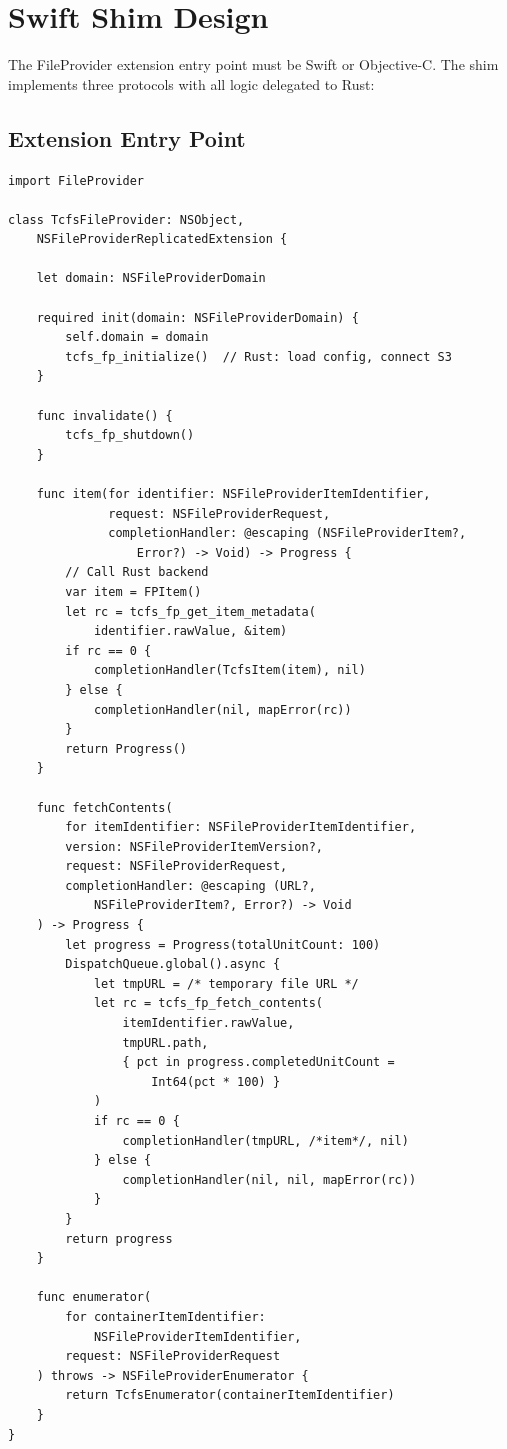 \documentclass[11pt,a4paper]{article}
\begin{document}
\section{Swift Shim Design}

The FileProvider extension entry point must be Swift or Objective-C.
The shim implements three protocols with all logic delegated to Rust:

\subsection{Extension Entry Point}

\begin{lstlisting}[language={},title={TcfsFileProvider.swift (simplified)}]
import FileProvider

class TcfsFileProvider: NSObject,
    NSFileProviderReplicatedExtension {

    let domain: NSFileProviderDomain

    required init(domain: NSFileProviderDomain) {
        self.domain = domain
        tcfs_fp_initialize()  // Rust: load config, connect S3
    }

    func invalidate() {
        tcfs_fp_shutdown()
    }

    func item(for identifier: NSFileProviderItemIdentifier,
              request: NSFileProviderRequest,
              completionHandler: @escaping (NSFileProviderItem?,
                  Error?) -> Void) -> Progress {
        // Call Rust backend
        var item = FPItem()
        let rc = tcfs_fp_get_item_metadata(
            identifier.rawValue, &item)
        if rc == 0 {
            completionHandler(TcfsItem(item), nil)
        } else {
            completionHandler(nil, mapError(rc))
        }
        return Progress()
    }

    func fetchContents(
        for itemIdentifier: NSFileProviderItemIdentifier,
        version: NSFileProviderItemVersion?,
        request: NSFileProviderRequest,
        completionHandler: @escaping (URL?,
            NSFileProviderItem?, Error?) -> Void
    ) -> Progress {
        let progress = Progress(totalUnitCount: 100)
        DispatchQueue.global().async {
            let tmpURL = /* temporary file URL */
            let rc = tcfs_fp_fetch_contents(
                itemIdentifier.rawValue,
                tmpURL.path,
                { pct in progress.completedUnitCount =
                    Int64(pct * 100) }
            )
            if rc == 0 {
                completionHandler(tmpURL, /*item*/, nil)
            } else {
                completionHandler(nil, nil, mapError(rc))
            }
        }
        return progress
    }

    func enumerator(
        for containerItemIdentifier:
            NSFileProviderItemIdentifier,
        request: NSFileProviderRequest
    ) throws -> NSFileProviderEnumerator {
        return TcfsEnumerator(containerItemIdentifier)
    }
}
\end{lstlisting}
\end{document}
